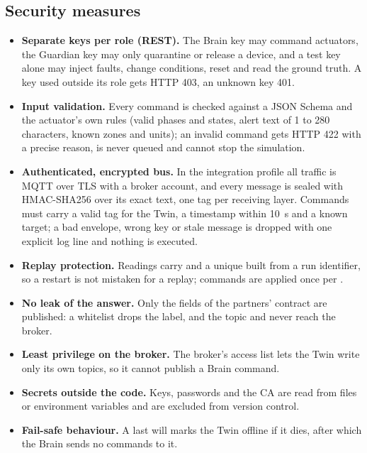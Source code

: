 \subsection{Security measures}
\begin{itemize}
\item \textbf{Separate keys per role (REST).} The Brain key may command actuators, the Guardian key may only quarantine or release a device, and a test key alone may inject faults, change conditions, reset
and read the ground truth. A key used outside its role gets HTTP 403, an unknown key 401.
\item \textbf{Input validation.} Every command is checked against a JSON Schema and the actuator's own rules (valid phases and states, alert text of 1 to 280 characters, known zones and units); an invalid
command gets HTTP 422 with a precise reason, is never queued and cannot stop the simulation.
\item \textbf{Authenticated, encrypted bus.} In the integration profile all traffic is MQTT over TLS with a broker account, and every message is sealed with HMAC-SHA256 over its exact text, one tag per receiving layer.
Commands must carry a valid tag for the Twin, a timestamp within 10~s and a known target; a bad envelope, wrong key or stale message is dropped with one explicit log line and nothing is executed.
\item \textbf{Replay protection.} Readings carry  and a unique  built from a run identifier, so a restart is not mistaken for a replay; commands are applied once per .
\item \textbf{No leak of the answer.} Only the fields of the partners' contract are published: a whitelist drops the  label, and the  topic and  never reach the broker.
\item \textbf{Least privilege on the broker.} The broker's access list lets the Twin write only its own topics, so it cannot publish a Brain command.
\item \textbf{Secrets outside the code.} Keys, passwords and the CA are read from files or environment variables and are excluded from version control.
\item \textbf{Fail-safe behaviour.} A last will marks the Twin offline if it dies, after which the Brain sends no commands to it.
\end{itemize}

